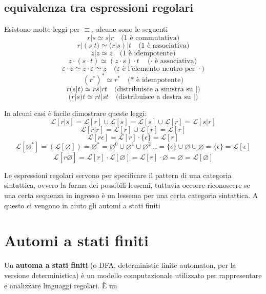 \subsection{equivalenza tra espressioni regolari}

Esistono molte leggi per $\equiv$, alcune sono le seguenti 
\[
r | s \simeq s | r \quad \text{(1 è commutativa)}
\]
\[
r | (s | t) \simeq (r | s) | t \quad \text{(1 è associativa)}
\]
\[
z | z \simeq z \quad \text{(1 è idempotente)}
\]
\[
z \cdot (s \cdot t) \simeq (z \cdot s) \cdot t \quad \text{($\cdot$ è associativa)}
\]
\[
\varepsilon \cdot z \simeq z \cdot \varepsilon \simeq z \quad \text{($\varepsilon$ è l'elemento neutro per $\cdot$)}
\]
\[
(r^*)^* \simeq r^* \quad \text{(* è idempotente)}
\]
\[
r (s | t) \simeq r s | r t \quad \text{(distribuisce a sinistra su |)}
\]
\[
(r | s) t \simeq r t | s t \quad \text{(distribuisce a destra su |)}
\]

In alcuni casi è facile dimostrare queste leggi:
\[
    \mathcal{L}[r|s] =\mathcal{L}[r]\cup\mathcal{L}[s]=\mathcal{L}[s]\cup\mathcal{L}[r] = \mathcal{L}[s|r]    
\]
\[
    \mathcal{L}[r|r]=\mathcal{L}[r]\cup \mathcal{L}[r]=\mathcal{L}[r]
\]
\[
    \mathcal{L}[r\epsilon] = \mathcal{L}[r]\cdot\{\epsilon\}=\mathcal{L}[r]
\]
\[
    \mathcal{L}[\varnothing^*] = (\mathcal{L}[\varnothing]) = \varnothing^*=\varnothing^0\cup\varnothing^1\cup\varnothing^2\dots=\{\epsilon\}\cup\varnothing\cup \varnothing=\{\epsilon\}=\mathcal{L}[\epsilon]    
\]
\[
    \mathcal{L}[r\dot \varnothing]=\mathcal{L}[r]\cdot\mathcal{L}[\varnothing]=\mathcal{L}[r]\cdot\varnothing=\varnothing=\mathcal{L}[\varnothing]    
\]

Le espressioni regolari servono per specificare il pattern di una categoria sintattica, ovvero la forma dei possibili lessemi, tuttavia occorre riconoscere se una certa sequenza in ingresso è un lessema per una certa categoria sintattica. A questo ci vengono in aiuto gli automi a stati finiti

\section{Automi a stati finiti}
Un \textbf{automa a stati finiti} (o DFA, deterministic finite automaton, per la versione deterministica) è un modello computazionale utilizzato per rappresentare e analizzare linguaggi regolari. È un 

